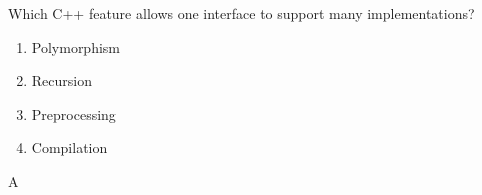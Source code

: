 
\item Which C++ feature allows one interface to support many implementations?
\begin{enumerate}[label=\Alph*.]
\item Polymorphism
\item Recursion
\item Preprocessing
\item Compilation
\end{enumerate}

\begin{solution}
    A
\end{solution}
